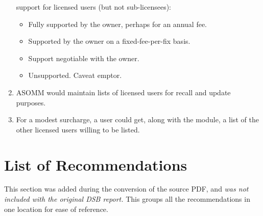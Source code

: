 \documentclass[11pt,final]{article}
\begin{document}
\begin{enumerate}
        support for licensed users (but not sub-licensees):
\begin{itemize}
        \item Fully supported by the owner, perhaps for an annual fee.
        \item Supported by the owner on a fixed-fee-per-fix basis.
        \item Support negotiable with the owner.
        \item Unsupported. Caveat emptor.
\end{itemize}
    \item ASOMM would maintain lists of licensed users for recall and update
        purposes.
    \item For a modest surcharge, a user could get, along with the module, a
        list of the other licensed users willing to be listed.
\end{enumerate}

\newpage

\section*{List of Recommendations}

This section was added during the conversion of the source PDF, and \emph{was not
included with the original DSB report.} This groups all the recommendations
in one location for ease of reference.
\end{document}

